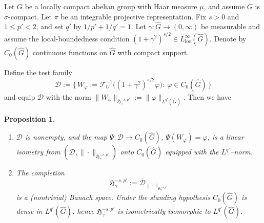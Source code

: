 \documentclass[11pt,a4paper]{article}
\newtheorem{proposition}[theorem]{Proposition}
\theoremstyle{definition}
\newcommand{\Ghat}{\widehat{G}}
\begin{document}
Let $G$ be a locally compact abelian group with Haar measure $\mu$, and assume $G$ is $\sigma$-compact. Let $\pi$ be an integrable projective representation.  Fix $s>0$ and $1\le p'<2$, and set $q'$ by $1/p'+1/q'=1$. Let
$\gamma:\widehat G\to(0,\infty)$ be measurable and assume the local-boundedness condition $(1+\gamma^2)^{s/2}\in L^\infty_{\mathrm{loc}}(\widehat G).$ Denote by $C_0(\Ghat)$ continuous functions on $\Ghat$ with compact support.

Define the test family
\[
\mathcal{D}:=\big\{\,W_\varphi:=\mathcal{F}_U^{-1}\big((1+\gamma^2)^{s/2}\varphi\big):\ \varphi\in C_0(\widehat G)\,\big\}
\]
and equip $\mathcal D$ with the norm $\|W_\varphi\|_{\mathfrak{H}^{-s,p'}_\gamma}:=\|\varphi\|_{L^{q'}(\widehat G)}$. Then we have


\begin{proposition}
\label{prop:W2-construction}
\begin{enumerate}
  \item $\mathcal D$ is nonempty, and the map $\Psi:\mathcal D\to C_0(\widehat G)$,
    $\Psi(W_\varphi)=\varphi$, is a linear isometry from $(\mathcal D,\|\cdot\|_{\mathfrak{H}^{-s,p'}_\gamma})$ onto $C_0(\widehat G)$ equipped with the $L^{q'}$--norm.
  \item The completion
    \[
      \mathfrak{H}^{-s,p'}_\gamma:=\overline{\mathcal D}_{\|\cdot\|_{\mathfrak{H}^{-s,p'}_\gamma}}
    \]
    is a (nontrivial) Banach space. Under the standing hypothesis $C_0(\widehat G)$ is dense in $L^{q'}(\widehat G)$, hence $\mathfrak{H}^{-s,p'}_\gamma$ is isometrically isomorphic to $L^{q'}(\widehat G)$.
  
\end{enumerate}
\end{proposition}
\end{document}
